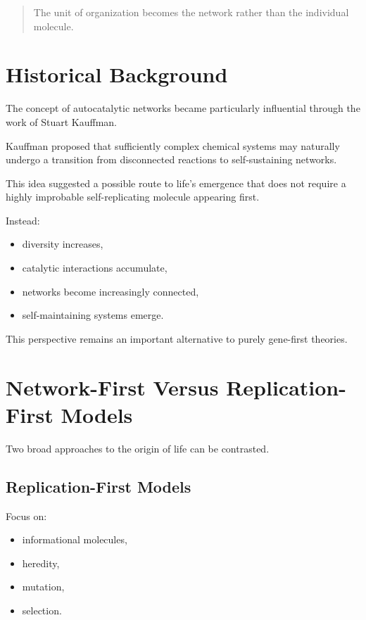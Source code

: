 \documentclass[
  oneside,
  openany]{book}
\providecommand{\tightlist}{%
  \setlength{\itemsep}{0pt}\setlength{\parskip}{0pt}}
\begin{document}
\begin{quote}
The unit of organization becomes the network rather than the individual molecule.
\end{quote}

\section{Historical Background}\label{historical-background}

The concept of autocatalytic networks became particularly influential through the work of Stuart Kauffman.

Kauffman proposed that sufficiently complex chemical systems may naturally undergo a transition from disconnected reactions to self-sustaining networks.

This idea suggested a possible route to life's emergence that does not require a highly improbable self-replicating molecule appearing first.

Instead:

\begin{itemize}
\tightlist
\item
  diversity increases,
\item
  catalytic interactions accumulate,
\item
  networks become increasingly connected,
\item
  self-maintaining systems emerge.
\end{itemize}

This perspective remains an important alternative to purely gene-first theories.

\section{Network-First Versus Replication-First Models}\label{network-first-versus-replication-first-models}

Two broad approaches to the origin of life can be contrasted.

\subsection{Replication-First Models}\label{replication-first-models}

Focus on:

\begin{itemize}
\tightlist
\item
  informational molecules,
\item
  heredity,
\item
  mutation,
\item
  selection.
\end{itemize}
\end{document}
